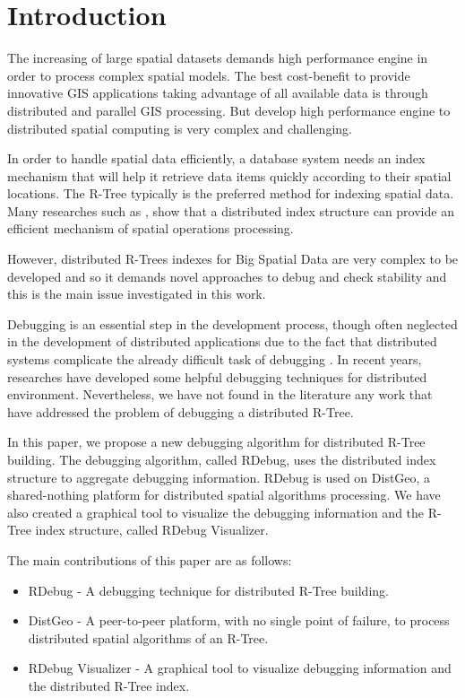 \section{Introduction}
\label{sec:intro}

The increasing of large spatial datasets demands high performance engine in order to process complex spatial models. 
The best cost-benefit to provide innovative GIS applications taking advantage of all available data is through distributed and parallel GIS processing. 
But develop high performance engine to distributed spatial computing is very complex and challenging.

In order to handle spatial data efficiently, a database system needs an index mechanism that will help it retrieve data items quickly according to their spatial locations. 
The R-Tree typically is the preferred method for indexing spatial data. Many researches such as  \cite{an1999storing,dedsi,zhong2012towards}, 
show that a distributed index structure can provide an efficient mechanism of spatial operations processing.

However, distributed R-Trees indexes for Big Spatial Data are very complex to be developed and so it demands novel approaches to debug and check stability and this is the main issue investigated in this work.

Debugging is an essential step in the development process, though often neglected in the development of distributed applications 
due to the fact that distributed systems complicate the already difficult task of debugging \cite{cheung1990Framework}.
In recent years, researches have developed some helpful debugging techniques for distributed environment. 
Nevertheless, we have not found in the literature any work that have addressed the problem of debugging a distributed R-Tree.

In this paper, we propose a new debugging algorithm for distributed R-Tree building. 
The debugging algorithm, called RDebug, uses the distributed index structure to aggregate debugging information. 
RDebug is used on DistGeo, a shared-nothing platform for distributed spatial algorithms processing. 
We have also created a graphical tool to visualize the debugging information and the R-Tree index structure, called RDebug Visualizer. 

The main contributions of this paper are as follows:

\begin{itemize}
  \item RDebug - A debugging technique for distributed R-Tree building.
  \item DistGeo - A peer-to-peer platform, with no single point of failure, to process distributed spatial algorithms of an R-Tree.
  \item RDebug Visualizer - A graphical tool to visualize debugging information and the distributed R-Tree index.
\end{itemize}

